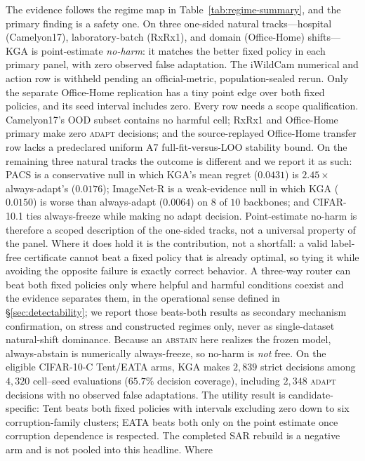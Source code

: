 The evidence follows the regime map in Table~\ref{tab:regime-summary}, and the primary finding is a
safety one. On three one-sided natural tracks---hospital
(Camelyon17), laboratory-batch (RxRx1), and domain (Office-Home)
shifts---KGA is point-estimate \emph{no-harm}: it matches the better fixed policy in each primary
panel, with zero observed false adaptation. The iWildCam numerical and action row is withheld
pending an official-metric, population-sealed rerun. Only the separate Office-Home replication has a tiny
point edge over both fixed policies, and its seed interval includes zero. Every row needs a scope
qualification. Camelyon17's OOD subset contains no harmful cell; RxRx1 and Office-Home primary make
zero \textsc{adapt} decisions; and the source-replayed Office-Home transfer row
lacks a predeclared uniform A7 full-fit-versus-LOO stability bound. On the remaining three natural tracks the outcome is different and we report it as such: PACS is
a conservative null in which \textsc{KGA}'s mean regret ($0.0431$) is $2.45\times$ always-adapt's
($0.0176$); ImageNet-R is a weak-evidence null in which \textsc{KGA} ($0.0150$) is worse than
always-adapt ($0.0064$) on $8$ of $10$ backbones; and CIFAR-10.1 ties always-freeze while making no
adapt decision. Point-estimate no-harm is therefore a scoped description of the one-sided tracks, not a
universal property of the panel. Where it does hold it is the contribution, not a shortfall: a valid
label-free certificate cannot beat a fixed policy that is already optimal, so tying it while avoiding
the opposite failure is exactly correct behavior. A three-way router can beat both fixed policies only
where helpful and harmful conditions coexist and the evidence separates them, in the operational sense
defined in \S\ref{sec:detectability}; we report those beats-both results as secondary mechanism
confirmation, on stress and constructed regimes only, never as single-dataset natural-shift dominance.
Because an \textsc{abstain} here realizes the frozen model, always-abstain is numerically
always-freeze, so no-harm is \emph{not} free. On the eligible CIFAR-10-C Tent/EATA arms, KGA makes
$2{,}839$ strict decisions among $4{,}320$ cell--seed evaluations ($65.7\%$ decision coverage),
including $2{,}348$ \textsc{adapt} decisions with no observed false adaptations. The utility result
is candidate-specific: Tent beats both fixed policies with intervals excluding zero down to six
corruption-family clusters; EATA beats both only on the point estimate once corruption dependence is
respected. The completed SAR rebuild is a negative arm and is not pooled into this headline. Where
